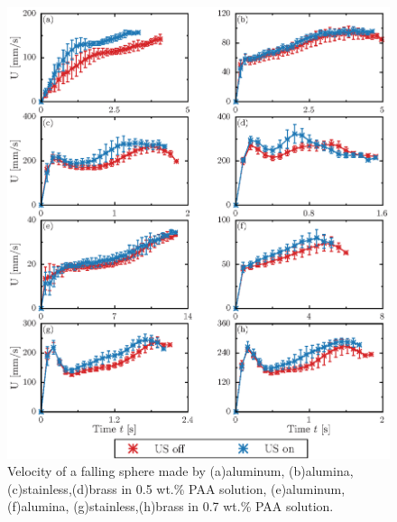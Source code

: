\begin{figure}[h]
    \centering
    \includegraphics[width=1.0\textwidth]{5-Results/0.5-0.7.eps}
    \caption{Velocity of a falling sphere made by (a)aluminum, (b)alumina, (c)stainless,(d)brass in 0.5 wt.\% PAA solution, (e)aluminum, (f)alumina, (g)stainless,(h)brass in 0.7 wt.\% PAA solution.}
    \label{fig:0.5-0.7}
\end{figure}

